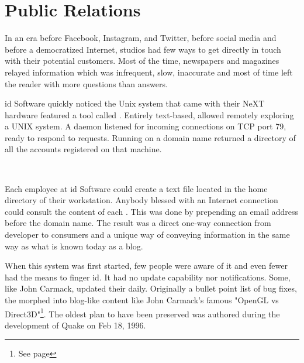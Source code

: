 \section{Public Relations}
In an era before Facebook, Instagram, and Twitter, before social media and before a democratized Internet, studios had few ways to get directly in touch with their potential customers. Most of the time, newspapers and magazines relayed information which was infrequent, slow, inaccurate and most of time left the reader with more questions than answers.


id Software quickly noticed the Unix system that came with their NeXT hardware featured a tool called . Entirely text-based,  allowed remotely exploring a UNIX system. A  daemon listened for incoming connections on TCP port 79, ready to respond to requests. Running  on a domain name returned a directory of all the accounts registered on that machine.\\
\par
{}
\par
{}\\
\par

Each employee at id Software could create a  text file located in the home directory of their \NeXT workstation. Anybody blessed with an Internet connection could consult the content of each . This was done by prepending an email address before the domain name. The result was a direct one-way connection from developer to consumers and a unique way of conveying information in the same way as what is known today as a blog.\\
\par
When this system was first started, few people were aware of it and even fewer had the means to finger id. It had no update capability nor notifications. Some, like John Carmack, updated their  daily. Originally a bullet point list of bug fixes, the  morphed into blog-like content like John Carmack's famous "OpenGL vs Direct3D"\footnote{See page \pageref{openglvsdirectd}}. The oldest plan to have been preserved was authored during the development of Quake on Feb 18, 1996.



